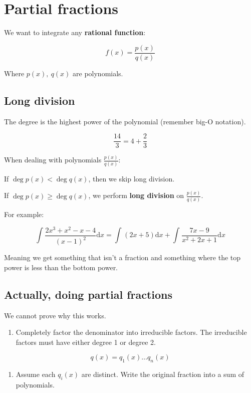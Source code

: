 \documentclass[12pt]{article}
\theoremstyle{plain}
\theoremstyle{remark}
\theoremstyle{definition}
\begin{document}
\section{Partial fractions}

We want to integrate any \textbf{rational function}:

\[f(x) = \frac{p(x)}{q(x)}\]

Where \(p(x),\ q(x)\) are polynomials.


\subsection{Long division}

The degree is the highest power of the polynomial (remember big-O
notation).

\[\frac{14}{3} = 4 + \frac{2}{3}\]

When dealing with polynomials \(\frac{p(x)}{q(x)}\):

If \(\deg{p(x)} < \deg{q(x)}\), then we skip long division.

If \(\deg{p(x)} \geq \deg{q(x)}\), we perform \textbf{long division} on
\(\frac{p(x)}{q(x)}\).


For example:

\[\int_{}^{}{\frac{2x^{3} + x^{2} - x - 4}{(x - 1)^{2}}\text{d}x} = \int_{}^{}{(2x + 5)\text{d}x} + \int_{}^{}{\frac{7x - 9}{x^{2} + 2x + 1}\text{d}x}\]

Meaning we get something that isn't a fraction and something where the
top power is less than the bottom power.


\subsection{Actually, doing partial
fractions}

We cannot prove why this works.

\begin{enumerate}
\def\labelenumi{\arabic{enumi}.}
\item
  Completely factor the denominator into irreducible factors. The
  irreducible factors must have either degree 1 or degree 2.
\end{enumerate}

\[q(x) = q_{1}(x)\ldots q_{n}(x)\]

\begin{enumerate}
\def\labelenumi{\arabic{enumi}.}
\setcounter{enumi}{1}
\item
  Assume each \(q_{i}(x)\) are distinct. Write the original fraction
  into a sum of polynomials.
\end{enumerate}
\end{document}
